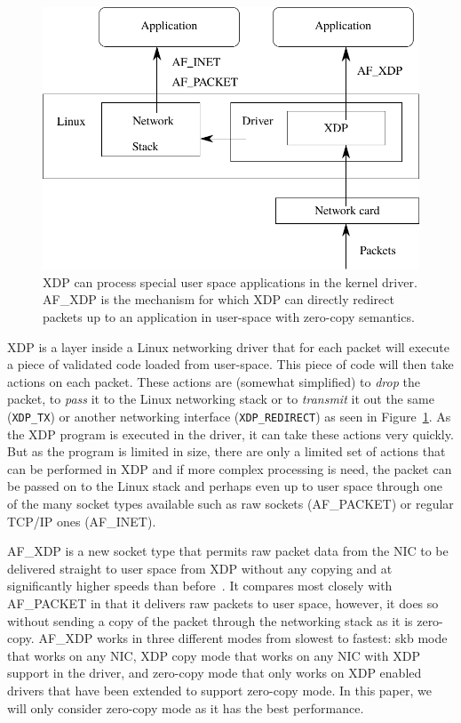 \documentclass[9pt,numbers,reprint]{sigplanconf}
\begin{document}
\begin{figure}[ht]
\includegraphics[width=.48\textwidth]{xdp.pdf}
\caption{XDP can process special user space applications in the kernel
  driver. AF\_XDP is the mechanism for which XDP can directly redirect
  packets up to an application in user-space with zero-copy semantics.}
\label{fig:xdp}
\end{figure}

XDP is a layer inside a Linux networking driver that for each packet
will execute a piece of validated code loaded from
user-space. This piece of code will then take actions on each
packet. These actions are (somewhat simplified) to \emph{drop} the
packet, to \emph{pass} it to the Linux networking stack or to
\emph{transmit} it out the same ({\tt XDP\_TX}) or another networking
interface ({\tt XDP\_REDIRECT}) as seen in Figure~\ref{fig:xdp}. As the XDP
program is executed in the driver, it can take these actions
very quickly. But as the program is limited in size, there are only
a limited set of actions that can be performed in XDP and if more complex
processing is need, the packet can be passed on to the Linux stack and
perhaps even up to user space through one of the many socket types
available such as raw sockets (AF\_PACKET) or regular TCP/IP ones
(AF\_INET).

AF\_XDP is a new socket type that permits raw packet data from the NIC
to be delivered straight to user space from XDP without any copying
and at significantly higher speeds than before~\cite{af_packet_v4}. It
compares most closely with AF\_PACKET in that it delivers raw packets
to user space, however, it does so without sending a copy of the
packet through the networking stack as it is zero-copy. AF\_XDP works
in three different modes from slowest to fastest: skb mode that works
on any NIC, XDP copy mode that works on any NIC with XDP support in
the driver, and zero-copy mode that only works on XDP enabled drivers
that have been extended to support zero-copy mode. In this paper, we
will only consider zero-copy mode as it has the best performance.
\end{document}
